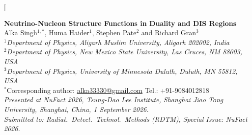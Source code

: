 \documentclass[10pt,twocolumn]{article}
\date{}
\begin{document}
\flushbottom

\twocolumn[{%
\begin{center}
  {\Large\bfseries Neutrino-Nucleon Structure Functions in Duality and
  DIS Regions}\\[0.5em]

  {\normalsize
  Alka Singh$^{1,*}$,  Huma Haider$^{1}$,  Stephen Pate$^{2}$  and  Richard Gran$^{3}$
  }\\[0.25em]

  {\small
  \itshape $^1$Department of Physics, Aligarh Muslim University, Aligarh 202002, India\\
  $^2$Department of Physics, New Mexico State University, Las Cruces, NM 88003, USA\\
  $^3$Department of Physics, University of Minnesota Duluth, Duluth, MN 55812, USA}\\[0.25em]

  {\small
  $^*$Corresponding author: \href{mailto:alka33330@gmail.com}{alka33330@gmail.com}
  \quad Tel.: +91-9084012818}\\[0.25em]

  {\small\itshape
  Presented at NuFact 2026, Tsung-Dao Lee Institute,
  Shanghai Jiao Tong University, Shanghai, China, 1 September 2026.\\
  Submitted to: \emph{Radiat.\ Detect.\ Technol.\ Methods} (RDTM),
  Special Issue: NuFact 2026.}

\end{center}
\vspace{0.2em}

}
\end{document}
